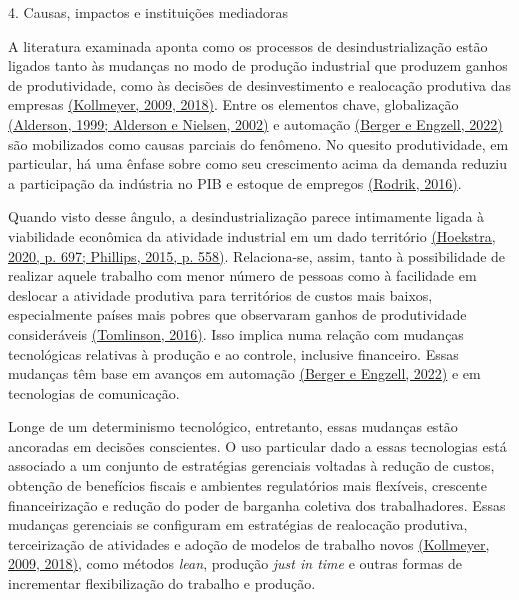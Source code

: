 4. Causas, impactos e instituições mediadoras

A literatura examinada aponta como os processos de desindustrialização
estão ligados tanto às mudanças no modo de produção industrial que
produzem ganhos de produtividade, como às decisões de desinvestimento e
realocação produtiva das empresas
\href{https://www.zotero.org/google-docs/?F7H7gv}{(Kollmeyer, 2009,
2018)}. Entre os elementos chave, globalização
\href{https://www.zotero.org/google-docs/?6Of68o}{(Alderson, 1999;
Alderson e Nielsen, 2002)} e automação
\href{https://www.zotero.org/google-docs/?Wnb2hL}{(Berger e Engzell,
2022)} são mobilizados como causas parciais do fenômeno. No quesito
produtividade, em particular, há uma ênfase sobre como seu crescimento
acima da demanda reduziu a participação da indústria no PIB e estoque de
empregos \href{https://www.zotero.org/google-docs/?Q1XrCC}{(Rodrik,
2016)}.

Quando visto desse ângulo, a desindustrialização parece intimamente
ligada à viabilidade econômica da atividade industrial em um dado
território \href{https://www.zotero.org/google-docs/?YT2Gwk}{(Hoekstra,
2020, p. 697; Phillips, 2015, p. 558)}. Relaciona-se, assim, tanto à
possibilidade de realizar aquele trabalho com menor número de pessoas
como à facilidade em deslocar a atividade produtiva para territórios de
custos mais baixos, especialmente países mais pobres que observaram
ganhos de produtividade consideráveis
\href{https://www.zotero.org/google-docs/?W9IXhk}{(Tomlinson, 2016)}.
Isso implica numa relação com mudanças tecnológicas relativas à produção
e ao controle, inclusive financeiro. Essas mudanças têm base em avanços
em automação \href{https://www.zotero.org/google-docs/?gj4heC}{(Berger e
Engzell, 2022)} e em tecnologias de comunicação.

Longe de um determinismo tecnológico, entretanto, essas mudanças estão
ancoradas em decisões conscientes. O uso particular dado a essas
tecnologias está associado a um conjunto de estratégias gerenciais
voltadas à redução de custos, obtenção de benefícios fiscais e ambientes
regulatórios mais flexíveis, crescente financeirização e redução do
poder de barganha coletiva dos trabalhadores. Essas mudanças gerenciais
se configuram em estratégias de realocação produtiva, terceirização de
atividades e adoção de modelos de trabalho novos
\href{https://www.zotero.org/google-docs/?YGzUlj}{(Kollmeyer, 2009,
2018)}, como métodos \emph{lean}, produção \emph{just in time} e outras
formas de incrementar flexibilização do trabalho e produção.

